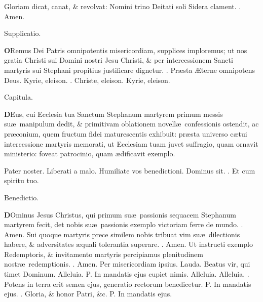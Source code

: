 \documentclass[letter,11pt]{book}
\makeatletter
\DeclareRobustCommand{\Vbar}{\vers@resp{-0.1em}{V}}
\DeclareRobustCommand{\Rbar}{\vers@resp{0pt}{R}}
\newcommand{\vers@resp@sym}{\raisebox{0.2ex}{\rotatebox[origin=c]{-20}{$\m@th\rceil$}}}
\newcommand{\vers@resp}[2]{%
  {\ooalign{\hidewidth\kern#1\vers@resp@sym\hidewidth\cr#2\cr}}%
}%
\def\P{\color{Red} P. \color{black}}
\def\V{\color{Red} \Vbar . \color{black}}
\def\R{\color{Red} \Rbar . \color{black}}
\makeatother
\begin{document}
\begin{multicols*}{2}
\newline \indent Gloriam dicat, canat, \& revolvat:
\newline \indent Nomini trino Deitati soli
\newline \indent \indent Sidera clament.
\newline \indent \indent \R Amen.
\vspace{-.5em} \begin{center} \color{Red} Supplicatio. \color{black} \end{center} \vspace{-.5em}
\lettrine[lines=2]{\bfseries \color{Red} O}{}Remus Dei Patris omnipotentis misericordiam, supplices imploremus; ut nos gratia Christi sui Domini nostri Jesu Christi, \& per intercessionem Sancti martyris sui Stephani propitius justificare dignetur. \R Pr\ae sta \AE terne omnipotens Deus. Kyrie, eleison. \R Christe, eleison. Kyrie, eleison.
\vspace{-.5em} \begin{center} \color{Red} Capitula. \color{black} \end{center} \vspace{-.5em}
\lettrine[lines=2]{\bfseries \color{Red} D}{}Eus, cui Ecclesia tua Sanctum Stephanum martyrem primum messis su\ae \ manipulum dedit, \& primitivam oblationem novell\ae \ confessionis ostendit, ac pr\ae conium, quem fructum fidei maturescentis exhibuit: pr\ae sta universo c\ae tui intercessione martyris memorati, ut Ecclesiam tuam juvet suffragio, quam ornavit ministerio: foveat patrocinio, quam \ae dificavit exemplo.
\par Pater noster. Liberati a malo. Humiliate vos benedictioni. Dominus sit. \R Et cum spiritu tuo.
\vspace{-.5em} \begin{center} \color{Red} Benedictio. \color{black} \end{center} \vspace{-.5em}
\lettrine[lines=2]{\bfseries \color{Red} D}{}Ominus Jesus Christus, qui primum su\ae \ passionis sequacem Stephanum martyrem fecit, det nobis su\ae \ passionis exemplo victoriam ferre de mundo. \R Amen. Sui quoque martyris prece similem nobis tribuat vim su\ae \ dilectionis habere, \& adversitates \ae quali tolerantia superare. \R Amen. Ut instructi exemplo Redemptoris, \& invitamento martyris percipiamus plenitudinem nostr\ae \ redemptionis. \R Amen. Per misericordiam ipsius.
\newline \color{Red} Lauda. \color{black} Beatus vir, qui timet Dominum. Alleluia. \P In mandatis ejus cupiet nimis. Alleluia. Alleluia. \V Potens in terra erit semen ejus, generatio rectorum benedicetur. \P In mandatis ejus. \V Gloria, \& honor Patri, \&c. \P In mandatis ejus.

\end{multicols*}
\end{document}
